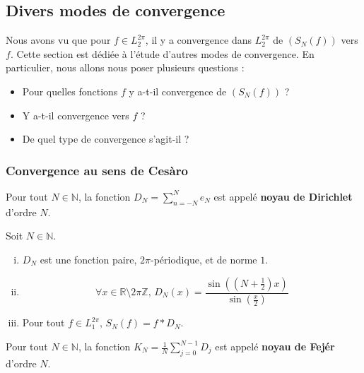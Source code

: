 	\newpage
	\subsection{Divers modes de convergence}


	Nous avons vu que pour $f \in L_2^{2\pi}$, il y a convergence dans $L_2^{2\pi}$ de $(S_N(f))$ vers $f$. Cette section est dédiée à l'étude d'autres modes de convergence. En particulier, nous allons nous poser plusieurs questions :

	\begin{itemize}
		\item Pour quelles fonctions $f$ y a-t-il convergence de $(S_N(f))$ ?
		\item Y a-t-il convergence vers $f$ ?
		\item De quel type de convergence s'agit-il ?
	\end{itemize}

	\subsubsection{Convergence au sens de Cesàro}


	\begin{definition}
		Pour tout $N \in \mathbb{N}$, la fonction $D_N = \sum_{n=-N}^{N} e_N$ est appelé \textbf{noyau de Dirichlet} d'ordre $N$.
	\end{definition}

	\begin{proposition}
		Soit $N \in \mathbb{N}$.
		\begin{enumerate}[(i)]
			\item $D_N$ est une fonction paire, $2\pi$-périodique, et de norme $1$.
			\item \[ \forall x \in \mathbb{R} \setminus 2 \pi \mathbb{Z}, \, D_N(x) = \frac{\sin \left(\left( N + \frac{1}{2} \right) x \right)}{\sin \left( \frac{x}{2} \right)} \]
			\item Pour tout $f \in L_1^{2 \pi}, \, S_N(f) = f * D_N$.
		\end{enumerate}
	\end{proposition}

	\begin{definition}
		Pour tout $N \in \mathbb{N}$, la fonction $K_N = \frac{1}{N} \sum_{j=0}^{N-1} D_j$ est appelé \textbf{noyau de Fejér} d'ordre $N$.
	\end{definition}

